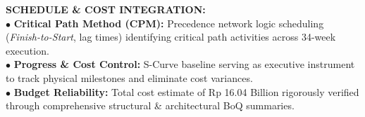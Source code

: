 \documentclass[10pt,a4paper,landscape]{article}
\begin{document}
\begin{minipage}[t]{0.30\linewidth}
  \begin{tcolorbox}[sharp corners, boxrule=0.6pt, colframe=pnavy, colback=pbglight, left=2.5mm, right=2.5mm, top=2mm, bottom=2mm, height=54mm]
    {\fontsize{7pt}{8.5pt}\selectfont\bfseries\color{pnavy}SCHEDULE \& COST INTEGRATION:}\\[1.5mm]
    {\fontsize{6.5pt}{8.2pt}\selectfont\color{psteel}
    $\bullet$ \textbf{Critical Path Method (CPM):} Precedence network logic scheduling (\textit{Finish-to-Start}, lag times) identifying critical path activities across 34-week execution.\\
    $\bullet$ \textbf{Progress \& Cost Control:} S-Curve baseline serving as executive instrument to track physical milestones and eliminate cost variances.\\
    $\bullet$ \textbf{Budget Reliability:} Total cost estimate of Rp 16.04 Billion rigorously verified through comprehensive structural \& architectural BoQ summaries.
    }
  \end{tcolorbox}
\end{minipage}%
\hfill
\end{document}
